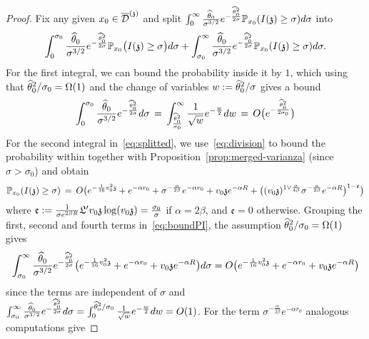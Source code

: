 \begin{proof}
Fix any given $x_0\in\overline{\mathcal{D}}^{(\mathfrak{z})}$ and split $\int_{0}^{\infty}\frac{\widehat{\theta}_0}{\sigma^{3/2}}e^{-\frac{\widehat{\theta}_0^2}{2\sigma}}\mathbb{P}_{x_0}(I(\mathfrak{z})\geq\sigma)d\sigma$ into
\begin{equation}\label{eq:splitted}\int_{0}^{\sigma_0}\frac{\widehat{\theta}_0}{\sigma^{3/2}}e^{-\frac{\widehat{\theta}_0^2}{2\sigma}}\mathbb{P}_{x_0}\big(I(\mathfrak{z})\geq\sigma\big)d\sigma+\int_{\sigma_0}^{\infty}\frac{\widehat{\theta}_0}{\sigma^{3/2}}e^{-\frac{\widehat{\theta}_0^2}{2\sigma}}\mathbb{P}_{x_0}(I(\mathfrak{z})\geq\sigma)d\sigma.\end{equation}
For the first integral, we can bound the probability inside it by $1$, which using that $\widehat{\theta}_0^2/\sigma_0=\Omega(1)$
and the change of variables $w:=\widehat{\theta}_0^2/\sigma$ gives a bound
\[\int_{0}^{\sigma_0}\frac{\widehat{\theta}_0}{\sigma^{3/2}}e^{-\frac{\widehat{\theta}_0^2}{2\sigma}}d\sigma\,=\,\int_{\frac{\widehat{\theta}_0^2}{\sigma_0}}^\infty\frac{1}{\sqrt{w}}e^{-\frac{w}{2}}dw\,=\,O\big(e^{-\frac{\widehat{\theta}_0^2}{2\sigma_0}}\big)\]
 For the second integral in~\eqref{eq:splitted}, we use~\eqref{eq:division} to bound the probability within   together with Proposition~\ref{prop:merged-varianza} (since $\sigma>\sigma_0$) and obtain
\begin{equation}\label{eq:boundPI}\mathbb{P}_{x_0}(I(\mathfrak{z})\geq\sigma)\,=\,O\big(e^{-\frac{1}{16}v_0^2\mathfrak{z}}+e^{-\alpha r_0}+\sigma^{-\frac{\alpha}{2\beta}} e^{-\alpha r_0}+v_0\mathfrak{z} e^{-\alpha R}+
\big((v_0\mathfrak{z})^{1\vee\frac{\alpha}{4\beta}}\sigma^{-\frac{\alpha}{2\beta}}e^{-\alpha R}\big)^{1-\mathfrak{e}}\big)\end{equation}
where $\mathfrak{e}:=\frac{1}{\sigma e^{2\beta R}}\mathfrak{L}'v_0\mathfrak{z}\log (v_0\mathfrak{z})=\frac{\sigma_0}{\sigma}$ if $\alpha=2\beta$, and $\mathfrak{e}=0$ otherwise. Grouping the first, second and fourth terms in~\eqref{eq:boundPI}, the assumption $\widehat{\theta}_0^2/\sigma_0= \Omega(1)$ gives
\[\int_{\sigma_0}^{\infty}\frac{\widehat{\theta}_0}{\sigma^{3/2}}e^{-\frac{\widehat{\theta}_0^2}{2\sigma}}\big(e^{-\frac{1}{16}v_0^2\mathfrak{z}}+e^{-\alpha r_0}+v_0\mathfrak{z} e^{-\alpha R}\big)d\sigma=O\big(e^{-\frac{1}{16}v_0^2\mathfrak{z}}+e^{-\alpha r_0}+v_0\mathfrak{z} e^{-\alpha R}\big)\]
since the terms are independent of $\sigma$ and $\int_{\sigma_0}^{\infty}\frac{\widehat{\theta}_0}{\sigma^{3/2}}e^{-\frac{\widehat{\theta}_0^2}{2\sigma}}d\sigma=\int_0^{\widehat{\theta}_0^2/\sigma_0}\frac{1}{\sqrt{w}}e^{-\frac{w}{2}}dw=O(1)$. For the term $\sigma^{-\frac{\alpha}{2\beta}} e^{-\alpha r_0}$ analogous computations give 

\end{proof}
